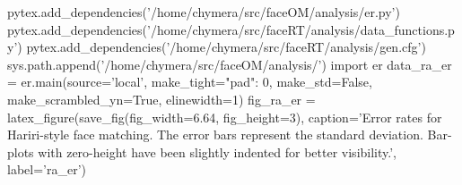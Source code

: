 \begin{pycode}[ra_er]
pytex.add_dependencies('/home/chymera/src/faceOM/analysis/er.py')
pytex.add_dependencies('/home/chymera/src/faceRT/analysis/data_functions.py')
pytex.add_dependencies('/home/chymera/src/faceRT/analysis/gen.cfg')
sys.path.append('/home/chymera/src/faceOM/analysis/')
import er
data_ra_er = er.main(source='local', make_tight={"pad": 0}, make_std=False, make_scrambled_yn=True, elinewidth=1)
fig_ra_er = latex_figure(save_fig(fig_width=6.64, fig_height=3), caption='Error rates for Hariri-style face matching. The error bars represent the standard deviation. Bar-plots with zero-height have been slightly indented for better visibility.', label='ra_er')
\end{pycode}
